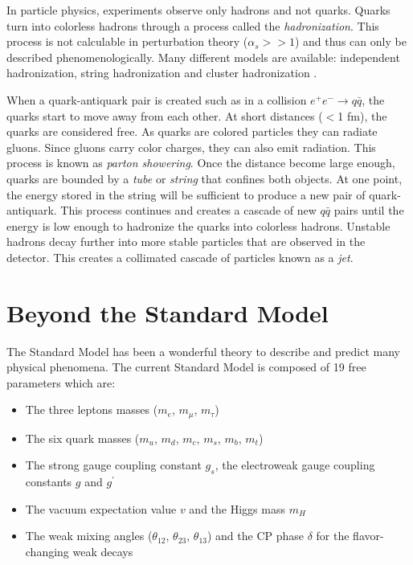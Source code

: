 In particle physics, experiments observe only hadrons and not quarks. Quarks turn into colorless hadrons through a process called the \textit{hadronization}. This process is not calculable in perturbation theory ($\alpha_s >> 1$) and thus can only be described phenomenologically. Many different models are available: independent hadronization, string hadronization \cite{Artru1988} and cluster hadronization \cite{Webber:1983if}.

When a quark-antiquark pair is created such as in a collision $e^+e^- \rightarrow q\bar{q}$, the quarks start to move away from each other. At short distances ($<$1 fm), the quarks are considered free. As quarks are colored particles they can radiate gluons. Since gluons carry color charges, they can also emit radiation. This process is known as \textit{parton showering}. Once the distance become large enough, quarks are bounded by a \textit{tube} or \textit{string} that confines both objects. At one point, the energy stored in the string will be sufficient to produce a new pair of quark-antiquark. This process continues and creates a cascade of new $q\bar{q}$ pairs until the energy is low enough to hadronize the quarks into colorless hadrons. Unstable hadrons decay further into more stable particles that are observed in the detector. This creates a collimated cascade of particles known as a \textit{jet}.

\section{Beyond the Standard Model}
\label{sec:BeyondSM}

The Standard Model has been a wonderful theory to describe and predict many physical phenomena. The current Standard Model is composed of 19 free parameters which are:

\begin{itemize}
  \item The three leptons masses ($m_e$, $m_{\mu}$, $m_{\tau}$)
  \item The six quark masses ($m_u$, $m_d$, $m_c$, $m_s$, $m_b$, $m_t$)
  \item The strong gauge coupling constant $g_s$, the electroweak gauge coupling constants $g$ and $g^{\prime}$
  \item The vacuum expectation value $v$ and the Higgs mass $m_H$
  \item The weak mixing angles ($\theta_{12}$, $\theta_{23}$, $\theta_{13}$) and the CP phase $\delta$ for the flavor-changing weak decays \cite{Kobayashi:1973pt}
\end{itemize}

